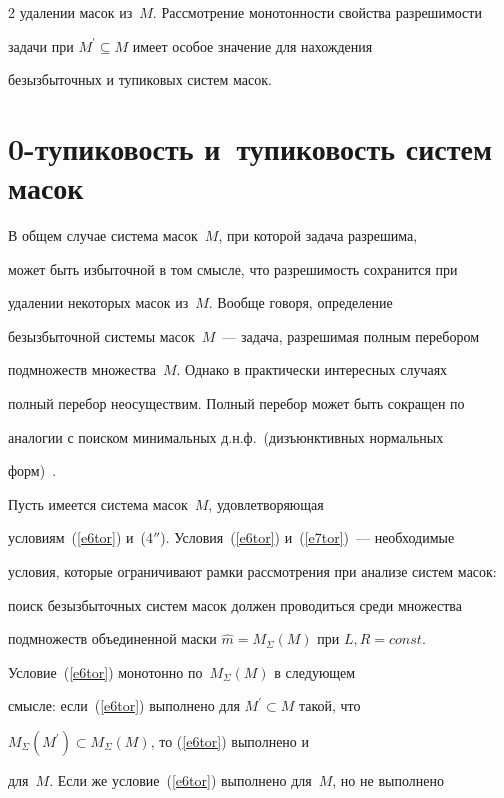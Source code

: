 \begin{multicols}{2}
удалении масок из~$M$. Рассмотрение монотонности свойства разрешимости 

задачи при $M^\prime\subseteq M$ имеет особое значение для нахождения 

безызбыточных и тупиковых систем масок.

{ %



}



\section{0-тупиковость и~тупиковость систем масок}



    В общем случае система масок~$M$, при которой задача разрешима, 

может быть избыточной в том смысле, что разрешимость сохранится при 

удалении некоторых масок из~$M$. Вообще говоря, определение 

безызбыточной системы масок~$M$~--- задача, разрешимая полным перебором 

подмножеств множества~$M$. Однако в практически интересных случаях 

полный перебор неосуществим. Полный  перебор может быть сокращен по 

аналогии с поиском минимальных д.н.ф.\ (дизъюнктивных нормальных 

форм)~\cite{15tor}. 



    Пусть имеется система масок~$M$, удовлетворяющая 

условиям~(\ref{e6tor}) и~(4$''$). Условия~(\ref{e6tor}) и~(\ref{e7tor})~--- необходимые 

условия, которые ограничивают рамки рассмотрения при анализе систем масок: 

поиск безызбыточных систем масок должен проводиться среди множества 

подмножеств объединенной маски $\hat{m} =M_\Sigma(M)$ при $L, R = const$. 



    Условие~(\ref{e6tor}) монотонно по~$M_\Sigma(M)$ в следующем 

смысле: если~(\ref{e6tor}) выполнено для $M^\prime \subset M$ такой, что 

$M_\Sigma (M^\prime )\subset M_\Sigma(M)$, то (\ref{e6tor}) выполнено и 

для~$M$. Если же условие~(\ref{e6tor}) выполнено для~$M$, но не выполнено 


\end{multicols}
